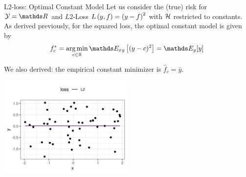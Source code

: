 \documentclass[11pt,compress,t,notes=noshow, xcolor=table]{beamer}
\begin{document}
\begin{vbframe}{L2-loss: Optimal Constant Model}
Let us consider the (true) risk for  $\Yspace = \R$ and $L2$-Loss $L\left(y, f\right) = \left(y-f\right)^2$ with $\mathcal{H}$ restricted to constants. %
As derived previously, for the squared loss, the optimal constant model is given by 
\vspace{-0.2cm}
$$f_{c}^{\ast} = \argmin_{c \in \mathbb{R}} \E_{xy} \left[(y-c)^2\right] =\E_{y}[y]$$



We also derived: the empirical constant minimizer is $\hat{f}_{c} = \bar y$.  
\vspace{-0.2cm}
\begin{center}
\includegraphics[width = 0.5\textwidth ]{figure/L2-loss.png} \\
\end{center}





\end{vbframe}
\end{document}
